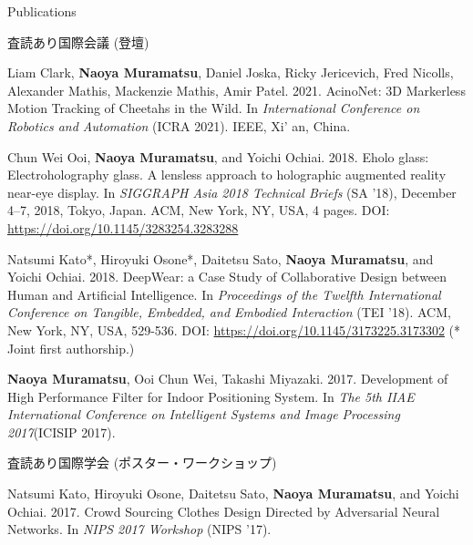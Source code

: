 \documentclass{resume} %
\begin{document}
\begin{rSection}{Publications} \itemsep 4pt



    \begin{rSubsection}{査読あり国際会議 (登壇)}{}{}{}{}
        \item Liam Clark, \textbf{Naoya Muramatsu}, Daniel Joska, Ricky Jericevich, Fred Nicolls, Alexander Mathis, Mackenzie Mathis, Amir Patel. 2021. AcinoNet: 3D Markerless Motion Tracking of Cheetahs in the Wild. In \textit{International Conference on Robotics and Automation} (ICRA 2021). IEEE, Xi' an, China.

        \item Chun Wei Ooi, \textbf{Naoya Muramatsu}, and Yoichi Ochiai. 2018. Eholo glass: Electroholography glass. A lensless approach to holographic augmented reality near-eye display. In \textit{SIGGRAPH Asia 2018 Technical Briefs} (SA ’18), December 4–7, 2018, Tokyo, Japan. ACM, New York, NY, USA, 4 pages. DOI: \url{https://doi.org/10.1145/3283254.3283288}

        \item Natsumi Kato*, Hiroyuki Osone*, Daitetsu Sato, \textbf{Naoya Muramatsu}, and Yoichi Ochiai. 2018. DeepWear: a Case Study of Collaborative Design between Human and Artificial Intelligence. In \textit{Proceedings of the Twelfth International Conference on Tangible, Embedded, and Embodied Interaction} (TEI ’18). ACM, New York, NY, USA, 529-536. DOI: \url{https://doi.org/10.1145/3173225.3173302} (* Joint first authorship.)

        \item \textbf{Naoya Muramatsu}, Ooi Chun Wei, Takashi Miyazaki. 2017. Development of High Performance Filter for Indoor Positioning System. In \textit{The 5th IIAE International Conference on Intelligent Systems and Image Processing 2017}(ICISIP 2017).
    \end{rSubsection}

    \begin{rSubsection}{査読あり国際学会 (ポスター・ワークショップ)}{}{}{}{}
        \item Natsumi Kato, Hiroyuki Osone, Daitetsu Sato, \textbf{Naoya Muramatsu}, and Yoichi Ochiai. 2017. Crowd Sourcing Clothes Design Directed by Adversarial Neural Networks. In \textit{NIPS 2017 Workshop} (NIPS ’17).


\end{rSubsection}
\end{rSection}
\end{document}
